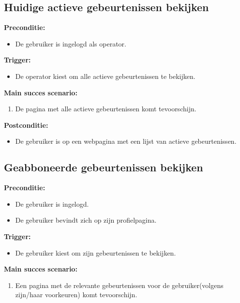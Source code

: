 \documentclass[11pt,twoside,a4paper]{article}
\newcommand{\subpunt}[1]{
	\noindent
	\textbf{\small{#1}}
}
\newenvironment{precond}{
	\subpunt{Preconditie:}
	\begin{itemize}[label={}]
}{
	\end{itemize}
}
\newenvironment{trigger}{
	\subpunt{Trigger:}
	\begin{itemize}[label={}]
}{
	\end{itemize}
}
\newenvironment{mainss}{
	\subpunt{Main succes scenario:}
	\begin{enumerate}
}{
	\end{enumerate}
}
\newenvironment{postcond}{
	\subpunt{Postconditie:}
	\begin{itemize}[label={}]
}{
	\end{itemize}
}
\begin{document}
	
	\subsection{Huidige actieve gebeurtenissen bekijken}\label{all_events}
	
	\begin{precond}
		\item De gebruiker is ingelogd als operator.
	\end{precond}
	
	\begin{trigger}
		\item De operator kiest om alle actieve gebeurtenissen te bekijken.
	\end{trigger}
	
	\begin{mainss}
		\item De pagina met alle actieve gebeurtenissen komt tevoorschijn.
	\end{mainss}
	
	\begin{postcond}
		\item De gebruiker is op een webpagina met een lijst van actieve gebeurtenissen.
	\end{postcond}
	
	
	\subsection{Geabboneerde gebeurtenissen bekijken}
	
	\begin{precond}
		\item De gebruiker is ingelogd.
		\item De gebruiker bevindt zich op zijn profielpagina.
	\end{precond}
	
	\begin{trigger}
		\item De gebruiker kiest om zijn gebeurtenissen te bekijken.
	\end{trigger}
	
	\begin{mainss}
		\item Een pagina met de relevante gebeurtenissen voor de gebruiker(volgens zijn/haar voorkeuren) komt tevoorschijn.
	\end{mainss}
	
\end{document}
